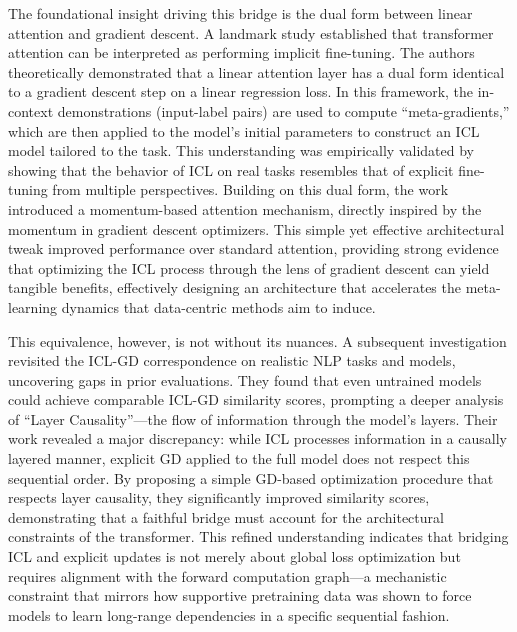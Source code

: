 \documentclass[11pt]{article}
\begin{document}
The foundational insight driving this bridge is the dual form between linear attention and gradient descent. A landmark study \cite{ref25} established that transformer attention can be interpreted as performing implicit fine-tuning. The authors theoretically demonstrated that a linear attention layer has a dual form identical to a gradient descent step on a linear regression loss. In this framework, the in-context demonstrations (input-label pairs) are used to compute ``meta-gradients,'' which are then applied to the model's initial parameters to construct an ICL model tailored to the task. This understanding was empirically validated by showing that the behavior of ICL on real tasks resembles that of explicit fine-tuning from multiple perspectives. Building on this dual form, the work introduced a momentum-based attention mechanism, directly inspired by the momentum in gradient descent optimizers. This simple yet effective architectural tweak improved performance over standard attention, providing strong evidence that optimizing the ICL process through the lens of gradient descent can yield tangible benefits, effectively designing an architecture that accelerates the meta-learning dynamics that data-centric methods aim to induce.

This equivalence, however, is not without its nuances. A subsequent investigation \cite{ref10} revisited the ICL-GD correspondence on realistic NLP tasks and models, uncovering gaps in prior evaluations. They found that even untrained models could achieve comparable ICL-GD similarity scores, prompting a deeper analysis of ``Layer Causality''---the flow of information through the model's layers. Their work revealed a major discrepancy: while ICL processes information in a causally layered manner, explicit GD applied to the full model does not respect this sequential order. By proposing a simple GD-based optimization procedure that respects layer causality, they significantly improved similarity scores, demonstrating that a faithful bridge must account for the architectural constraints of the transformer. This refined understanding indicates that bridging ICL and explicit updates is not merely about global loss optimization but requires alignment with the forward computation graph---a mechanistic constraint that mirrors how supportive pretraining data was shown to force models to learn long-range dependencies in a specific sequential fashion.
\end{document}
